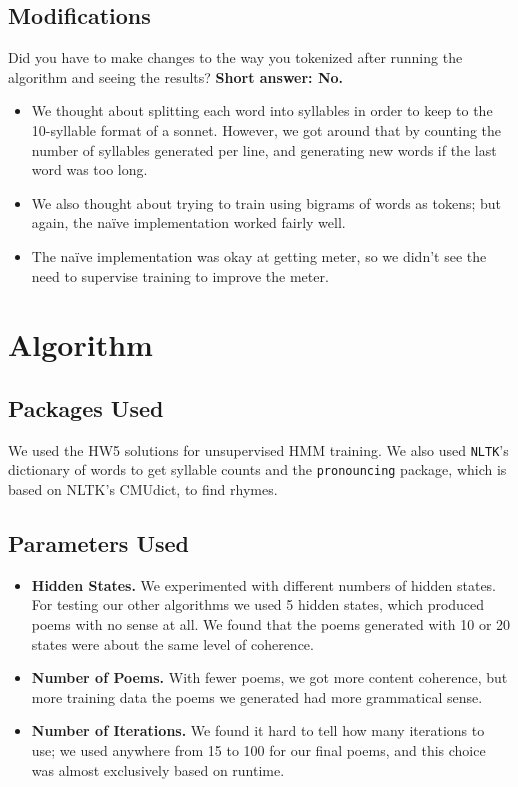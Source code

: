 \subsection{Modifications}
Did you have to make changes to the way you tokenized after running the algorithm and seeing the results? \textbf{Short answer: No.}
\begin{itemize}
	\item We thought about splitting each word into syllables in order to keep to the 10-syllable format of a sonnet. However, we got around that by counting the number of syllables generated per line, and generating new words if the last word was too long.
	\item We also thought about trying to train using bigrams of words as tokens; but again, the na\"ive implementation worked fairly well.
  \item The na\"ive implementation was okay at getting meter, so we didn't see the need to supervise training to improve the meter.
\end{itemize}


\section{Algorithm}
\subsection{Packages Used}
We used the HW5 solutions for unsupervised HMM training. We also used {\tt NLTK}'s dictionary of words to get syllable counts and the {\tt pronouncing} package, which is based on {\tt} NLTK's CMUdict, to find rhymes.
\subsection{Parameters Used}
\begin{itemize}
\item \textbf{Hidden States.} We experimented with different numbers of hidden states. For testing our other algorithms we used 5 hidden states, which produced poems with no sense at all. We found that the poems generated with 10 or 20 states were about the same level of coherence.
\item \textbf{Number of Poems.} With fewer poems, we got more content coherence, but more training data the poems we generated had more grammatical sense.
\item \textbf{Number of Iterations.} We found it hard to tell how many iterations to use; we used anywhere from 15 to 100 for our final poems, and this choice was almost exclusively based on runtime.
\end{itemize}




